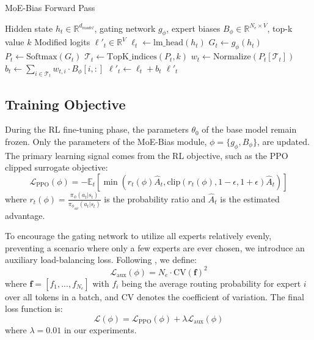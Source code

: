 \documentclass{article}
\begin{document}
\begin{algorithm}[t]
\caption{MoE-Bias Forward Pass}
\label{alg:moe_bias}
\begin{algorithmic}[1]
\REQUIRE Hidden state $h_t \in \mathbb{R}^{d_{model}}$, gating network $g_\phi$, expert biases $B_\phi \in \mathbb{R}^{N_e \times V}$, top-k value $k$
\ENSURE Modified logits $\ell'_t \in \mathbb{R}^V$
\STATE $\ell_t \leftarrow \text{lm\_head}(h_t)$ 
\STATE $G_t \leftarrow g_\phi(h_t)$ 
\STATE $P_t \leftarrow \text{Softmax}(G_t)$ 
\STATE $\mathcal{T}_t \leftarrow \text{TopK\_indices}(P_t, k)$ 
\STATE $w_t \leftarrow \text{Normalize}(P_t[\mathcal{T}_t])$ 
\STATE $b_t \leftarrow \sum_{i \in \mathcal{T}_t} w_{t,i} \cdot B_{\phi}[i, :]$ 
\STATE $\ell'_t \leftarrow \ell_t + b_t$ 
\RETURN $\ell'_t$
\end{algorithmic}
\end{algorithm}

\subsection{Training Objective}
During the RL fine-tuning phase, the parameters $\theta_0$ of the base model remain frozen. Only the parameters of the MoE-Bias module, $\phi = \{g_\phi, B_\phi\}$, are updated. The primary learning signal comes from the RL objective, such as the PPO clipped surrogate objective:
\begin{equation}
    \mathcal{L}_{\text{PPO}}(\phi) = -\mathbb{E}_t \left[ \min\left( r_t(\phi) \hat{A}_t, \text{clip}(r_t(\phi), 1-\epsilon, 1+\epsilon) \hat{A}_t \right) \right]
\end{equation}
where $r_t(\phi) = \frac{\pi_\phi(a_t|s_t)}{\pi_{\phi_{old}}(a_t|s_t)}$ is the probability ratio and $\hat{A}_t$ is the estimated advantage.

To encourage the gating network to utilize all experts relatively evenly, preventing a scenario where only a few experts are ever chosen, we introduce an auxiliary load-balancing loss. Following \citet{shazeer2017outrageously}, we define:
\begin{equation}
    \mathcal{L}_{\text{aux}}(\phi) = N_e \cdot \text{CV}(\mathbf{f})^2
\end{equation}
where $\mathbf{f} = [f_1, ..., f_{N_e}]$ with $f_i$ being the average routing probability for expert $i$ over all tokens in a batch, and CV denotes the coefficient of variation. The final loss function is:
\begin{equation}
    \mathcal{L}(\phi) = \mathcal{L}_{\text{PPO}}(\phi) + \lambda \mathcal{L}_{\text{aux}}(\phi)
\end{equation}
where $\lambda = 0.01$ in our experiments.
\end{document}

